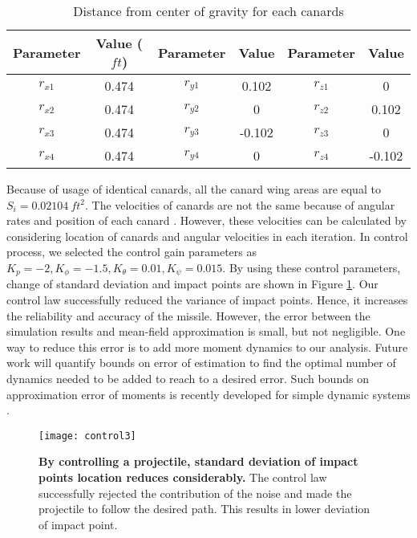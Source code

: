 \documentclass[letterpaper, 10 pt, conference]{ieeeconf}  %
\begin{document}
\begin{table}[!h]
	\caption{\label{tab:canarddistance}Distance from center of gravity for each canards}
	\centering
	\begin{tabular}{cccccc} 
		\hline
		Parameter &Value ($ft$) &Parameter &Value &Parameter &Value\\
		\hline
$r_{x1}$& 0.474 & $r_{y1}$& 0.102 & $r_{z1}$& 0\\
$r_{x2}$& 0.474 & $r_{y2}$& 0 & $r_{z2}$& 0.102\\
$r_{x3}$& 0.474 & $r_{y3}$& -0.102 & $r_{z3}$& 0\\
$r_{x4}$& 0.474 & $r_{y4}$& 0 & $r_{z4}$& -0.102 \\
			\hline
	\end{tabular}
\end{table} 	
Because of usage of identical canards, all the canard wing areas are equal to $S_i=0.02104 \ ft^2$. The velocities of canards are not the same because of angular rates and position of each canard \cite{costel97pot}. However, these velocities can be calculated by considering location of canards and angular velocities in each iteration. In control process, we selected the control gain parameters as $K_p=-2, K_{\phi}=-1.5, K_{\theta}=0.01, K_{\psi}=0.015$. By using these control parameters, change of standard deviation and impact points are shown in Figure \ref{fig:control}. Our control law successfully reduced the variance of impact points. Hence, it increases the reliability and accuracy of the missile. However, the error between the simulation results and mean-field approximation is small, but not negligible. One way to reduce this error is to add more moment dynamics to our analysis. Future work will quantify bounds on error of estimation to find the optimal number of dynamics needed to be added to reach to a desired error. Such bounds on approximation error of moments is recently developed for simple dynamic systems \cite{ghusinga2017exact, lamperski2016stochastic}.
 


\begin{figure}[!h]
\centering
\texttt{[image: control3]}
\caption{\textbf{By controlling a projectile, standard deviation of impact points location reduces considerably.} The control law successfully rejected the contribution of the noise and made the projectile to follow the desired path. This results in lower deviation of impact point.}
\label{fig:control}
\end{figure}
\end{document}
